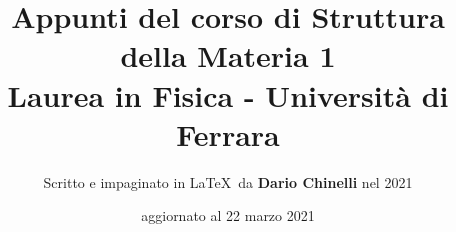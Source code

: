 \documentclass[11pt]{article}
\begin{document}
\title{\textbf{Appunti del corso di Struttura della Materia 1} \\
Laurea in Fisica - Università di Ferrara} 

\author{Scritto e impaginato in \LaTeX\ da \textbf{Dario Chinelli} nel 2021}

\date{aggiornato al 22 marzo 2021}

\maketitle

    \newpage

    \tableofcontents

    
    

    

    

    

    

    

    
    

    
    
    
    
    
    
    
    
    
    
    
    
    
    
    
    
    
    
    
    
\end{document}
